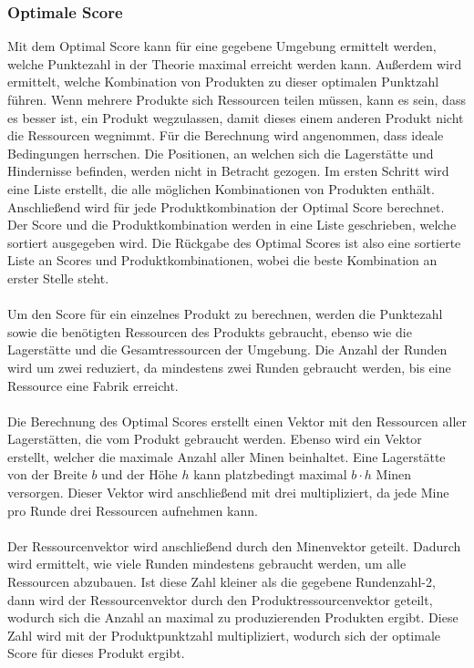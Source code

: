 \subsubsection*{Optimale Score}
Mit dem Optimal Score kann für eine gegebene Umgebung ermittelt werden, welche Punktezahl in der Theorie maximal erreicht werden kann. Außerdem wird ermittelt, welche Kombination von Produkten zu dieser optimalen Punktzahl führen. Wenn mehrere Produkte sich Ressourcen teilen müssen, kann es sein, dass es besser ist, ein Produkt wegzulassen, damit dieses einem anderen Produkt nicht die Ressourcen wegnimmt. 
Für die Berechnung wird angenommen, dass ideale Bedingungen herrschen. Die Positionen, an welchen sich die Lagerstätte und Hindernisse befinden, werden nicht in Betracht gezogen. 
Im ersten Schritt wird eine Liste erstellt, die alle möglichen Kombinationen von Produkten enthält. Anschließend wird für jede Produktkombination der Optimal Score berechnet. Der Score und die Produktkombination werden in eine Liste geschrieben, welche sortiert ausgegeben wird.  Die Rückgabe des Optimal Scores ist also eine sortierte Liste an Scores und Produktkombinationen, wobei die beste Kombination an erster Stelle steht.
\\\\
Um den Score für ein einzelnes Produkt zu berechnen, werden die Punktezahl sowie die benötigten Ressourcen des Produkts gebraucht, ebenso wie die Lagerstätte und die Gesamtressourcen der Umgebung. Die Anzahl der Runden wird um zwei reduziert, da mindestens zwei Runden gebraucht werden, bis eine Ressource eine Fabrik erreicht.
\\\\
Die Berechnung des Optimal Scores erstellt einen Vektor mit den Ressourcen aller Lagerstätten, die vom Produkt gebraucht werden. Ebenso wird ein Vektor erstellt, welcher die maximale Anzahl aller Minen beinhaltet. Eine Lagerstätte von der Breite $b$ und der Höhe $h$ kann platzbedingt maximal $b\cdot h$ Minen versorgen. Dieser Vektor wird anschließend mit drei multipliziert, da jede Mine pro Runde drei Ressourcen aufnehmen kann.
\\\\
Der Ressourcenvektor wird anschließend durch den Minenvektor geteilt. Dadurch wird ermittelt, wie viele Runden mindestens gebraucht werden, um alle Ressourcen abzubauen. Ist diese Zahl kleiner als die gegebene Rundenzahl-2, dann wird der Ressourcenvektor durch den Produktressourcenvektor geteilt, wodurch sich die Anzahl an maximal zu produzierenden Produkten ergibt. Diese Zahl wird mit der Produktpunktzahl multipliziert, wodurch sich der optimale Score für dieses Produkt ergibt.
